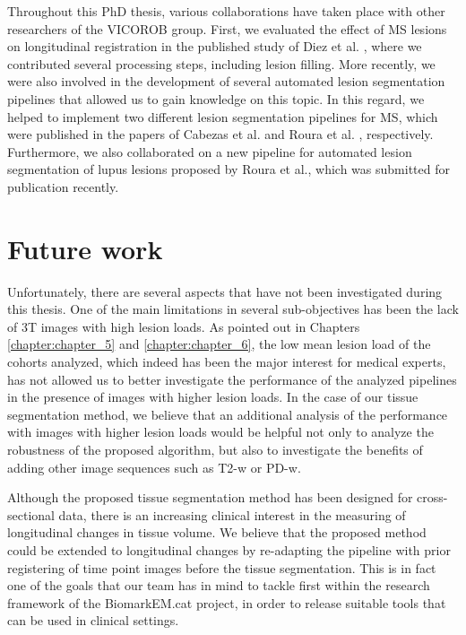 \begin{itemize}
\end{itemize}

Throughout this PhD thesis, various collaborations have taken place with other researchers of the VICOROB group. First, we evaluated the effect of MS lesions on longitudinal registration in the published study of Diez et al. \cite{Diez2014}, where we contributed several processing steps, including lesion filling. More recently, we were also involved in the development of several automated lesion segmentation pipelines that allowed us to gain knowledge on this topic. In this regard, we helped to implement two different lesion segmentation pipelines for MS, which were published in the papers of Cabezas et al. \cite{Cabezas2014b} and Roura et al. \cite{Roura2015}, respectively. Furthermore, we also collaborated on a new pipeline for automated lesion segmentation of lupus lesions proposed by Roura et al., which was submitted for publication recently. 

\section{Future work}

Unfortunately, there are several aspects that have not been investigated during this thesis. One of the main limitations in several sub-objectives has been the lack of 3T images with high lesion loads. As pointed out in Chapters \ref{chapter:chapter_5} and \ref{chapter:chapter_6}, the low mean lesion load of the cohorts analyzed, which indeed has been the major interest for medical experts, has not allowed us to better investigate the performance of the analyzed pipelines in the presence of images with higher lesion loads. In the case of our tissue segmentation method, we believe that an additional analysis of the performance with images with higher lesion loads would be helpful not only to analyze the robustness of the proposed algorithm, but also to investigate the benefits of adding other image sequences such as T2-w or PD-w. 

Although the proposed tissue segmentation method has been designed for cross-sectional data, there is an increasing clinical interest in the measuring of longitudinal changes in tissue volume. We believe that the proposed method could be extended to longitudinal changes by re-adapting the pipeline with prior registering of time point images before the tissue segmentation. This is in fact one of the goals that our team has in mind to tackle first within the research framework of the BiomarkEM.cat project, in order to release suitable tools that can be used in clinical settings. 

